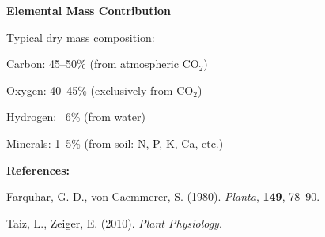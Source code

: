 \begin{technical}
\vspace{0.5em}
\noindent\textbf{Elemental Mass Contribution}

\vspace{0.2em}
\noindent Typical dry mass composition:\par

\noindent Carbon: 45–50\% (from atmospheric $\mathrm{CO}_2$)

\noindent Oxygen: 40–45\% (exclusively from $\mathrm{CO}_2$)

\noindent Hydrogen: ~6\% (from water)

\noindent Minerals: 1–5\% (from soil: N, P, K, Ca, etc.)

\vspace{0.5em}
\noindent\textbf{References:}

\vspace{0.2em}
\noindent Farquhar, G. D., von Caemmerer, S. (1980). \textit{Planta}, \textbf{149}, 78–90.

\noindent Taiz, L., Zeiger, E. (2010). \textit{Plant Physiology}.
\end{technical}
